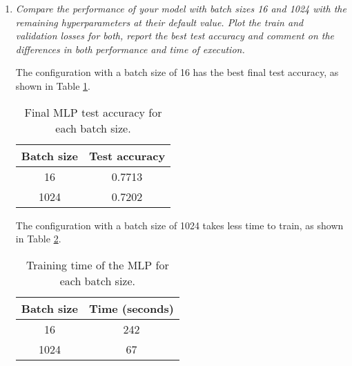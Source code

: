 \documentclass[12pt]{article}
\begin{document}
\begin{enumerate}[leftmargin=\labelsep]
          \begin{enumerate}[label=\alph*)]
              \item \textit{Compare the performance of your model with batch sizes 16 and 1024 with
                        the remaining hyperparameters at their default value. Plot the train and validation
                        losses for both, report the best test accuracy and comment on the differences in both
                        performance and time of execution.}

                    \vspace{12pt}

                    The configuration with a batch size of 16 has the best final test accuracy, as shown in Table \ref{tab:mlp-batch-size-accuracy}.

                    \vspace{12pt}

                    \begin{table}[H]
                        \centering
                        \begin{tabular}{|c|c|}
                            \hline
                            Batch size & Test accuracy \\ \hline
                            16         & 0.7713        \\ \hline
                            1024       & 0.7202        \\ \hline
                        \end{tabular}
                        \caption{Final MLP test accuracy for each batch size.}
                        \label{tab:mlp-batch-size-accuracy}
                    \end{table}

                    The configuration with a batch size of 1024 takes less time to train, as shown in Table \ref{tab:mlp-batch-size-time}.

                    \vspace{12pt}

                    \begin{table}[H]
                        \centering
                        \begin{tabular}{|c|c|}
                            \hline
                            Batch size & Time (seconds) \\ \hline
                            16         & 242            \\ \hline
                            1024       & 67             \\ \hline
                        \end{tabular}
                        \caption{Training time of the MLP for each batch size.}
                        \label{tab:mlp-batch-size-time}
                    \end{table}


\end{enumerate}
\end{enumerate}
\end{document}

